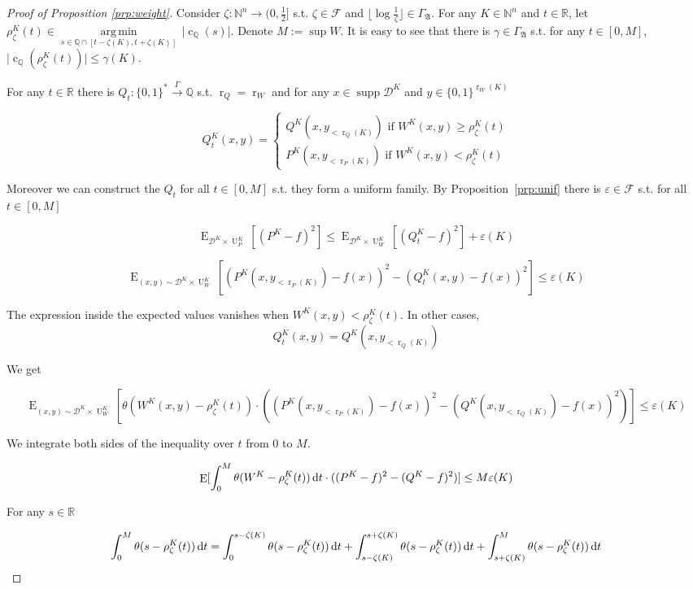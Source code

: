 \documentclass{article}
\numberwithin{equation}{section}
\theoremstyle{definition}
\theoremstyle{plain}
\newcommand{\Bool}{\{0,1\}}
\newcommand{\Words}{{\Bool^*}}
\newcommand{\WordsLen}[1]{{\Bool^{#1}}}
\DeclareMathOperator{\Supp}{supp}
\DeclareMathOperator{\E}{E}
\DeclareMathOperator{\R}{r}
\DeclareMathOperator{\Un}{U}
\DeclareMathOperator{\En}{c}
\newcommand{\Argmin}[1]{\underset{#1}{\operatorname{arg\,min}}\,}
\newcommand{\Nats}{\mathbb{N}}
\newcommand{\Rats}{\mathbb{Q}}
\newcommand{\Reals}{\mathbb{R}}
\newcommand{\NatFun}{\Nats^n \rightarrow}
\newcommand{\Abs}[1]{\lvert #1 \rvert}
\newcommand{\Floor}[1]{\lfloor #1 \rfloor}
\newcommand{\Dist}{\mathcal{D}}
\newcommand{\GrowA}{\Gamma_{\mathfrak{A}}}
\newcommand{\Fall}{\mathcal{F}}
\newcommand{\Scheme}{\xrightarrow{\Gamma}}
\begin{document}
\begin{proof}[Proof of Proposition \ref{prp:weight}]

Consider $\zeta: \NatFun (0,\frac{1}{2}]$ s.t.  $\zeta \in \Fall$ and $\Floor{\log \frac{1}{\zeta}} \in \GrowA$. For any $K \in \Nats^n$ and $t \in \Reals$, let $\rho_\zeta^{K}(t) \in \Argmin{s \in \Rats \cap [t-\zeta(K),t+\zeta(K)]} \Abs{\En_\Rats(s)}$. Denote $M:= \sup W$. It is easy to see that there is $\gamma \in \GrowA$ s.t. for any $t \in [0, M]$, ${\Abs{\En_\Rats(\rho_\zeta^{K}(t))} \leq \gamma(K)}$.

For any $t \in \Reals$ there is $Q_t: \Words \Scheme \Rats$ s.t. $\R_Q=\R_W$ and for any ${x \in \Supp \Dist^{K}}$ and ${y \in \WordsLen{\R_W(K)}}$

$$Q_t^{K}(x,y)=\begin{cases}Q^{K}(x,y_{< \R_Q(K)}) \text{ if } W^{K}(x,y) \geq \rho^{K}_\zeta(t) \\ P^{K}(x,y_{< \R_P(K)}) \text{ if } W^{K}(x,y) < \rho^{K}_\zeta(t)\end{cases}$$

Moreover we can construct the $Q_t$ for all $t \in [0, M]$ s.t. they form a uniform family. By Proposition~\ref{prp:unif} there is $\varepsilon \in \Fall$ s.t. for all $t \in [0, M]$

$$\E_{\Dist^{K} \times \Un_P^{K}}[(P^{K}-f)^2] \leq \E_{\Dist^{K} \times \Un_W^{K}}[(Q_t^{K}-f)^2] + \varepsilon(K)$$

$$\E_{(x,y) \sim \Dist^{K} \times \Un_W^{K}}[(P^{K}(x,y_{< \R_P(K)})-f(x))^2-(Q_t^{K}(x,y)-f(x))^2] \leq \varepsilon(K)$$

The expression inside the expected values vanishes when $W^{K}(x,y) < \rho^{K}_\zeta(t)$. In other cases, 
\[Q_t^{K}(x,y) = Q^{K}(x,y_{< \R_Q(K)})\]

We get

$$\E_{(x,y) \sim \Dist^{K} \times \Un_W^{K}}[\theta(W^{K}(x,y)-\rho_\zeta^{K}(t)) \cdot ((P^{K}(x,y_{< \R_P(K)})-f(x))^2-(Q^{K}(x,y_{< \R_Q(K)})-f(x))^2)] \leq \varepsilon(K)$$

We integrate both sides of the inequality over $t$ from 0 to $M$.

\begin{equation}
\label{eqn:prp__weight__prf1}
\E[\int_0^M\theta(W^{K}-\rho_\zeta^{K}(t)) \dif t \cdot ((P^{K}-f)^2-(Q^{K}-f)^2)] \leq M \varepsilon(K)
\end{equation}

For any $s \in \Reals$

$$\int_0^M \theta(s-\rho_\zeta^{K}(t)) \dif t = \int_0^{s-\zeta(K)} \theta(s-\rho_\zeta^{K}(t)) \dif t + \int_{s-\zeta(K)}^{s+\zeta(K)} \theta(s-\rho_\zeta^{K}(t)) \dif t + \int_{s+\zeta(K)}^M \theta(s-\rho_\zeta^{K}(t)) \dif t$$


\end{proof}
\end{document}
